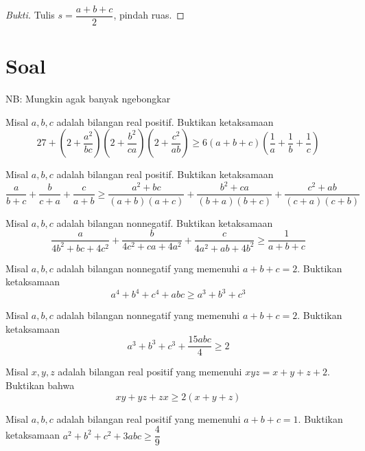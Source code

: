 \documentclass[11pt]{scrartcl}
\begin{document}
\begin{proof}[Bukti]
Tulis $s = \dfrac{a + b + c}{2}$, pindah ruas.
\end{proof}

\section{Soal}
NB: Mungkin agak banyak ngebongkar
\begin{problem}
Misal $a, b, c$ adalah bilangan real positif. Buktikan ketaksamaan \[27 + \left(2 + \dfrac{a^2}{bc}\right) \left(2 + \dfrac{b^2}{ca}\right) \left(2 + \dfrac{c^2}{ab}\right) \geq 6(a + b + c)\left(\dfrac{1}{a} + \dfrac{1}{b} + \dfrac{1}{c}\right)\]
\end{problem}

\begin{problem}
Misal $a, b, c$ adalah bilangan real positif. Buktikan ketaksamaan \[\dfrac{a}{b + c} +  \dfrac{b}{c + a} + \dfrac{c}{a + b} \geq \dfrac{a^2 + bc}{(a + b)(a + c)} + \dfrac{b^2 + ca}{(b + a)(b + c)} + \dfrac{c^2 + ab}{(c + a)(c + b)}\]
\end{problem}

\begin{problem}
Misal $a, b, c$ adalah bilangan nonnegatif. Buktikan ketaksamaan \[\dfrac{a}{4b^2 + bc + 4c^2} + \dfrac{b}{4c^2 + ca + 4a^2} + \dfrac{c}{4a^2 + ab + 4b^2} \geq \dfrac{1}{a + b + c}\]
\end{problem}

\begin{problem}
Misal $a, b, c$ adalah bilangan nonnegatif yang memenuhi $a + b + c = 2$. Buktikan ketaksamaan \[a^4 + b^4 + c^4 + abc \geq a^3 + b^3 + c^3\]
\end{problem}

\begin{problem}
Misal $a, b, c$ adalah bilangan nonnegatif yang memenuhi $a + b + c = 2$. Buktikan ketaksamaan \[a^3 + b^3 + c^3 + \dfrac{15abc}{4} \geq 2\]
\end{problem}

\begin{problem}
Misal $x, y, z$ adalah bilangan real positif yang memenuhi $xyz = x + y + z + 2$. Buktikan bahwa \[xy + yz + zx \geq 2(x + y + z)\]
\end{problem}

\begin{problem}
Misal $a, b, c$ adalah bilangan real positif yang memenuhi $a + b + c = 1$. Buktikan ketaksamaan $a^2 + b^2 + c^2 + 3abc \geq \dfrac{4}{9}$
\end{problem}
\end{document}
